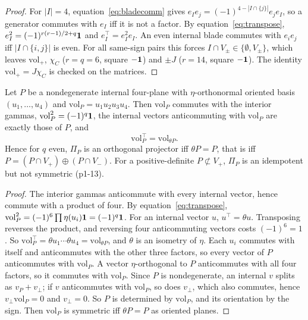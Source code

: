 \begin{proof}
For $|I|=4$, equation~\cref{eq:bladecomm} gives $e_Ie_j=(-1)^{4-|I\cap\{j\}|}e_je_I$, so a generator commutes with $e_I$ iff it is not a factor. By equation~\cref{eq:transpose}, $e_I^2=(-1)^{r(r-1)/2+q}\mathbf 1$ and $e_I^{\!\top}=e_I^2e_I$. An even internal blade commutes with $e_ie_j$ iff $|I\cap\{i,j\}|$ is even. For all same-sign pairs this
forces $I\cap V_\pm\in\{\emptyset,V_\pm\}$, which leaves $\mathrm{vol}_+$, $\chi_C$ ($r=q=6$, square $-\mathbf 1$) and $\pm J$ ($r=14$, square $-\mathbf 1$). The
identity $\mathrm{vol}_+=J\chi_C$ is checked on the matrices.
\end{proof}

\begin{lemma}
\label{p1:lem:transpose}
Let $P$ be a nondegenerate internal four-plane with $\eta$-orthonormal oriented basis $(u_1,\dots,u_4)$ and $\mathrm{vol}_P=u_1u_2u_3u_4$. Then $\mathrm{vol}_P$ commutes with the
interior gammas, $\mathrm{vol}_P^2=(-1)^q\mathbf 1$, the internal vectors anticommuting with $\mathrm{vol}_P$ are exactly those of $P$, and
\[
\mathrm{vol}_P^{\!\top}=\mathrm{vol}_{\theta P}.
\]
Hence for $q$ even, $\Pi_P$ is an orthogonal projector iff $\theta P=P$, that is iff $P=(P\cap V_+)\oplus(P\cap V_-)$. For a positive-definite $P\not\subset V_+$, $\Pi_P$ is
an idempotent but not symmetric (p1-13).
\end{lemma}

\begin{proof}
The interior gammas anticommute with every internal vector, hence commute with a product of four. By equation~\cref{eq:transpose}, $\mathrm{vol}_P^2=(-1)^6\prod\eta(u_i)\mathbf 1=(-1)^q\mathbf 1$.
For an internal vector $u$, $u^{\!\top}=\theta u$. Transposing reverses the product, and reversing four anticommuting vectors costs $(-1)^{6}=1$. So
$\mathrm{vol}_P^{\!\top}=\theta u_1\cdots\theta u_4=\mathrm{vol}_{\theta P}$, and $\theta$ is an isometry of $\eta$. Each $u_i$ commutes with itself and anticommutes with the other three
factors, so every vector of $P$ anticommutes with $\mathrm{vol}_P$. A vector $\eta$-orthogonal to $P$ anticommutes with all four factors, so it commutes with $\mathrm{vol}_P$. Since $P$ is
nondegenerate, an internal $v$ splits as $v_P+v_\perp$; if $v$ anticommutes with $\mathrm{vol}_P$, so does $v_\perp$, which also commutes, hence $v_\perp\mathrm{vol}_P=0$ and $v_\perp=0$.
So $P$ is determined by $\mathrm{vol}_P$, and its orientation by the sign. Then $\mathrm{vol}_P$ is symmetric iff $\theta P=P$ as oriented planes.
\end{proof}

